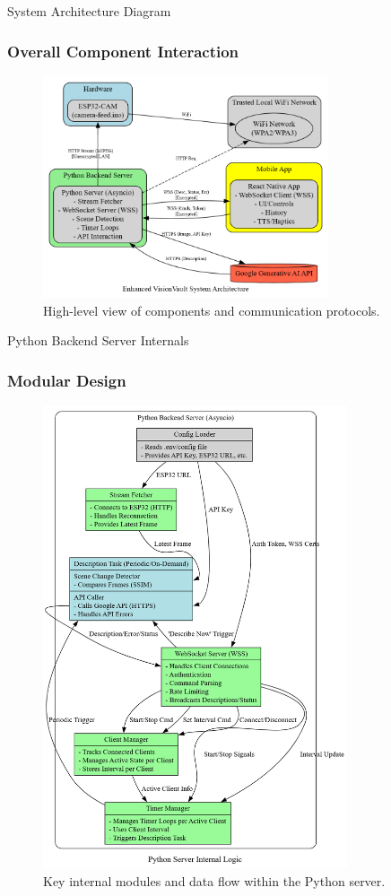 \documentclass{beamer}
\begin{document}
\begin{frame}{System Architecture Diagram}
    \frametitle{Overall Component Interaction}
    \begin{figure}
        \centering
        \includegraphics[width=0.75\textwidth]{Sys_Arch.png} %
        \caption{High-level view of components and communication protocols.}
    \end{figure}
\end{frame}

\begin{frame}{Python Backend Server Internals}
    \frametitle{Modular Design}
     \begin{figure}
        \centering
        \includegraphics[height=0.75\textheight, width=0.8\textwidth, keepaspectratio]{Python_Server_Internal_Logic_Diagram.png} %
        \caption{Key internal modules and data flow within the Python server.}
    \end{figure}
\end{frame}
\end{document}
